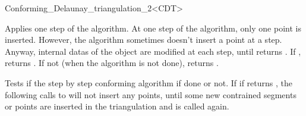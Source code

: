 \begin{ccRefClass}{Conforming_Delaunay_triangulation_2<CDT>}
\begin{ccAdvanced}
{ Applies one step of the algorithm. At one step of the algorithm,
  only one point is inserted. However, the algorithm sometimes doesn't
  insert a point at a step. Anyway, internal datas of the \ccRefName{}
  object are modified at each step, until 
  returns . If , returns
  . If not (when the algorithm is not done), returns
  .}



{ Tests if the step by step conforming algorithm if done or not. If if
  returns , the following calls to
   will not insert any points, until some
  new contrained segments or points are inserted in the triangulation and
   is called again. }

\end{ccAdvanced}

\end{ccRefClass}

